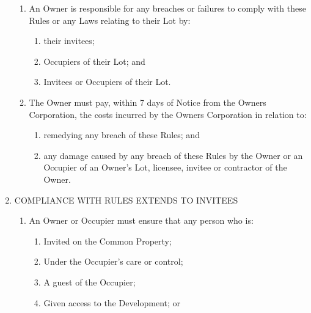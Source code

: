 \documentclass{article}
\begin{document}
\begin{enumerate}[label=\arabic*.]
\begin{enumerate}[label=\arabic{enumi}.\arabic*.]
\item  An Owner is responsible for any breaches or failures to comply with these Rules or any Laws relating to their Lot by:

\begin{enumerate}[label=(\arabic*)]

\item  their invitees;

\item  Occupiers of their Lot; and

\item  Invitees or Occupiers of their Lot.

\end{enumerate}

\item  The Owner must pay, within 7 days of Notice from the Owners Corporation, the costs incurred by the Owners Corporation in relation to:

\begin{enumerate}[label=(\arabic*)]

\item  remedying any breach of these Rules; and

\item  any damage caused by any breach of these Rules by the Owner or an Occupier of an Owner’s Lot, licensee, invitee or contractor of the Owner.

\end{enumerate}

\end{enumerate}

\item  COMPLIANCE WITH RULES EXTENDS TO INVITEES

\begin{enumerate}[label=\arabic{enumi}.\arabic*.]

\item  An Owner or Occupier must ensure that any person who is:

\begin{enumerate}[label=(\arabic*)]

\item  Invited on the Common Property;

\item  Under the Occupier’s care or control;

\item  A guest of the Occupier;

\item  Given access to the Development; or


\end{enumerate}
\end{enumerate}
\end{enumerate}
\end{document}
